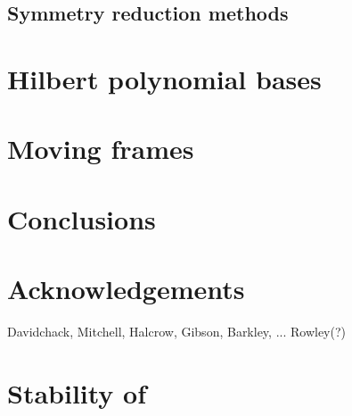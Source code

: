 \documentclass[aps,prl,preprint,superscriptaddress]{revtex4}
\begin{document}
\subsection{\label{s:symRedGeneral} Symmetry reduction methods}
    


\section{\label{s:introCLE} \CLe}
    


\section{\label{s:Hilbert} Hilbert polynomial bases}
    

\section{\label{sec:mf} Moving frames}
    
    
    
    


\section{Conclusions}
    

\section*{Acknowledgements}
 Davidchack, Mitchell, Halcrow, Gibson, Barkley, ... Rowley(?)


\appendix

\section{\label{s:StabReq} Stability of \reqva}
    






    
    
\end{document}
